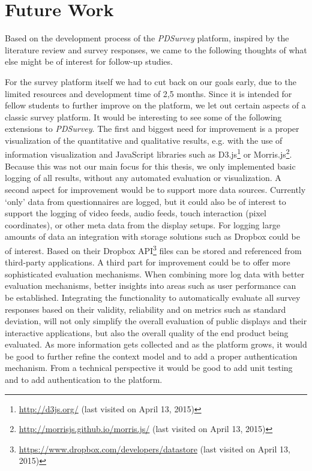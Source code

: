 \section{Future Work}
\label{chapter:future-work}
	
Based on the development process of the \textit{PDSurvey} platform, inspired by the literature review and survey responses, we came to the following thoughts of what else might be of interest for follow-up studies.


For the survey platform itself we had to cut back on our goals early, due to the limited resources and development time of 2,5 months. Since it is intended for fellow students to further improve on the platform, we let out certain aspects of a classic survey platform. It would be interesting to see some of the following extensions to \textit{PDSurvey}.
The first and biggest need for improvement is a proper visualization of the quantitative and qualitative results, e.g. with the use of information visualization and JavaScript libraries such as D3.js\footnote{\url{http://d3js.org/} (last visited on April 13, 2015)} or Morris.js\footnote{\url{http://morrisjs.github.io/morris.js/} (last visited on April 13, 2015)}. Because this was not our main focus for this thesis, we only implemented basic logging of all results, without any automated evaluation or visualization.
A second aspect for improvement would be to support more data sources. Currently `only' data from questionnaires are logged, but it could also be of interest to support the logging of video feeds, audio feeds, touch interaction (pixel coordinates), or other meta data from the display setups. For logging large amounts of data an integration with storage solutions such as Dropbox could be of interest. Based on their Dropbox API\footnote{\url{https://www.dropbox.com/developers/datastore} (last visited on April 13, 2015)} files can be stored and referenced from third-party applications.
A third part for improvement could be to offer more sophisticated evaluation mechanisms. When combining more log data with better evaluation mechanisms, better insights into areas such as user performance can be established. Integrating the functionality to automatically evaluate all survey responses based on their validity, reliability and on metrics such as standard deviation, will not only simplify the overall evaluation of public displays and their interactive applications, but also the overall quality of the end product being evaluated.
As more information gets collected and as the platform grows, it would be good to further refine the context model and to add a proper authentication mechanism. From a technical perspective it would be good to add unit testing and to add authentication to the platform.




